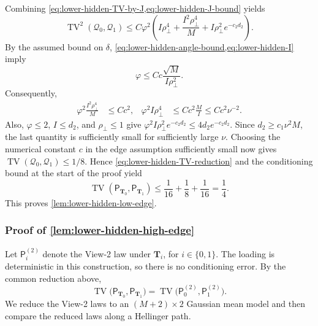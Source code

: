 \documentclass[11pt]{article}
\begin{document}
Combining
\cref{eq:lower-hidden-TV-by-J,eq:lower-hidden-J-bound} yields
\begin{equation}
  \operatorname{TV}^2(\mathcal Q_0,\mathcal Q_1)
  \le
  C\varphi^2
  \left(
    I\rho_\perp^4
    +
    \frac{I^2\rho_\perp^4}{M}
    +
    I\rho_\perp^2e^{-c_2d_2}
  \right).
\label{eq:lower-hidden-reduced-TV-bound}
\end{equation}
By the assumed bound on $\delta$,
\cref{eq:lower-hidden-angle-bound,eq:lower-hidden-I} imply
\begin{equation}
  \varphi
  \le
  Cc\frac{\sqrt M}{I\rho_\perp^2}.
\label{eq:lower-hidden-angle-information}
\end{equation}
Consequently,
\begin{align*}
  \varphi^2\frac{I^2\rho_\perp^4}{M}
  &\le Cc^2,
  &
  \varphi^2I\rho_\perp^4
  &\le Cc^2\frac{M}{I}
  \le Cc^2\nu^{-2}.
\end{align*}
Also, $\varphi\le2$, $I\le d_2$, and $\rho_\perp\le1$ give
$\varphi^2I\rho_\perp^2e^{-c_2d_2}\le4d_2e^{-c_2d_2}$.  Since
$d_2\ge c_1\nu^2M$, the last quantity is sufficiently small for sufficiently
large $\nu$.  Choosing the numerical constant $c$ in the edge assumption
sufficiently small now gives
$\operatorname{TV}(\mathcal Q_0,\mathcal Q_1)\le1/8$.  Hence
\cref{eq:lower-hidden-TV-reduction} and the conditioning bound at the start
of the proof yield
\[
  \operatorname{TV}(\mathsf P_{\bm T_0},\mathsf P_{\bm T_1})
  \le
  \frac1{16}+\frac18+\frac1{16}
  =
  \frac14.
\]
This proves \cref{lem:lower-hidden-low-edge}.



\subsubsection{Proof of \cref{lem:lower-hidden-high-edge}}

Let $\mathsf P_i^{(2)}$ denote the View-2 law under $\bm T_i$, for
$i\in\{0,1\}$.  The loading is deterministic in this construction, so there
is no conditioning error.  By the common reduction above,
\[
  \operatorname{TV}\bigl(
    \mathsf P_{\bm T_0},
    \mathsf P_{\bm T_1}
  \bigr)
  =
  \operatorname{TV}\bigl(
    \mathsf P_0^{(2)},
    \mathsf P_1^{(2)}
  \bigr).
\]
We reduce the View-2 laws to an $(M+2)\times2$ Gaussian mean model and then
compare the reduced laws along a Hellinger path.
\end{document}
